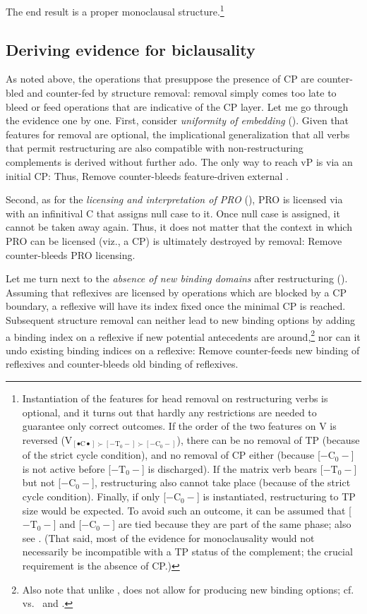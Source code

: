 \documentclass[output=paper]{langsci/langscibook}
\begin{document}
\largerpage
The end result is a proper monoclausal
structure.\footnote{\label{whytp}Instantiation of the features for head
removal on restructuring   verbs is optional, and it turns out that
hardly any restrictions are needed to guarantee only correct outcomes. If the
order of the two features on V is reversed (V$_{[\bullet\text{C}\bullet] \succ
[-\text{T}_0-] \succ [-\text{C}_0-]}$), there can be no removal of TP (because of the strict
cycle condition), and no removal of CP either (because [$-\text{C}_0-$] is not
active before [$-\text{T}_0-$] is discharged).  If the matrix verb  bears
[$-\text{T}_0-$] but not [$-\text{C}_0-$], restructuring also cannot take place
(because of the strict cycle condition). Finally, if only [$-\text{C}_0-$] is
instantiated, restructuring to TP size would be expected. To avoid such an
outcome, it can be assumed that [$-\text{T}_0-$] and [$-\text{C}_0-$] are tied
because they are part of the same phase; also see \citet{Pesetsky:16}. (That
said, most of the evidence for monoclausality would not necessarily be
incompatible with a TP status of the complement; the crucial requirement is the
absence of CP.)}

\subsection{Deriving evidence for biclausality}

As noted above, the operations that presuppose the presence of CP are
counter-bled and counter-fed by structure removal: removal simply comes too
late to bleed or feed operations that are indicative of the CP layer. Let me
go through the evidence one by one. First, consider {\itshape uniformity of
embedding} ().  Given that features for removal are
optional, the implicational generalization that all  verbs that permit
restructuring are also compatible with non-restructuring complements is
derived without further ado. The only way to reach vP is via an initial CP:
Thus, Remove counter-bleeds feature-driven external .

Second, as for the {\itshape licensing and interpretation of PRO} (), PRO
is licensed via  with an infinitival C that assigns null case to it. Once
null case is assigned, it cannot be taken away again. Thus, it does not matter
that the context in which PRO can be licensed (viz., a CP) is ultimately
destroyed by removal: Remove counter-bleeds PRO licensing.

Let me turn next to the {\itshape absence of new binding domains} after
restructuring ().  Assuming that reflexives are licensed by 
operations which are blocked by a CP boundary, a reflexive will have its index
fixed once the minimal CP is reached. Subsequent structure removal can neither
lead to new binding options by adding a binding index on a reflexive if new
potential antecedents are around,\footnote{Also note that unlike ,
     does not allow for  producing new binding options; cf.
\citet{Barss:86} vs.\ \citet{Frey:93} and \citet{Buering:05}.} nor can it undo
existing binding indices on a reflexive: Remove counter-feeds new binding of
reflexives and counter-bleeds old binding of reflexives.
\end{document}
